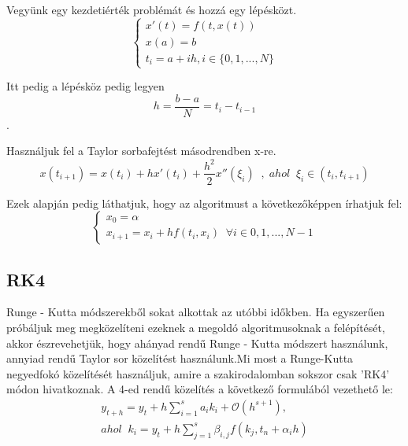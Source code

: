 \documentclass{article}
\theoremstyle{definition}
\theoremstyle{theorem}
\begin{document}
Vegyünk egy kezdetiérték problémát és hozzá egy lépésközt.
\begin{equation*}
    \begin{cases}
       x'(t) = f(t,x(t))\\
       x(a) = b \\
       t_i = a + ih , i \in \{0,1,...,N\}
    \end{cases}
\end{equation*}

Itt pedig a lépésköz pedig legyen \[h = \frac{b-a}{N} = t_i - t_{i-1} \] .

Használjuk fel a Taylor sorbafejtést másodrendben x-re.
\begin{equation*}
    x(t_{i+1}) = x(t_i) + h x'(t_i) + \frac{h^2}{2} x''(\xi_i) \;\;,\;ahol \;\;\xi _i \in (t_i, t_{i+1})
\end{equation*}

Ezek alapján pedig láthatjuk, hogy az algoritmust a következőképpen írhatjuk fel:
\begin{equation*}
    \begin{cases}
        x_0 = \alpha \\
        x_{i+1} = x_i + h f(t_i,x_i) \;\;\forall i \in{0,1,...,N-1}
    \end{cases}
\end{equation*}
\subsection{RK4}
Runge - Kutta módszerekből sokat alkottak az utóbbi időkben. Ha egyszerűen próbáljuk meg megközelíteni ezeknek a megoldó algoritmusoknak a felépítését, akkor észrevehetjük, hogy ahányad rendű Runge - Kutta módszert használunk, annyiad rendű Taylor sor közelítést használunk.Mi most a Runge-Kutta negyedfokó közelítését használjuk, amire a szakirodalomban sokszor csak 'RK4' módon hivatkoznak. A 4-ed rendű közelítés a következő formulából vezethető le:
\begin{equation*}
\begin{split}
      y_{t+h} = y_t + h \sum_{i=1}^{s} a_i k_i + \mathcal{O}(h^{s+1}),\\
      ahol\;\;k_i = y_t + h \sum_{j=1}^{s} \beta_{i,j} f(k_j,t_n + \alpha_ih)
\end{split}
\end{equation*}
\end{document}
